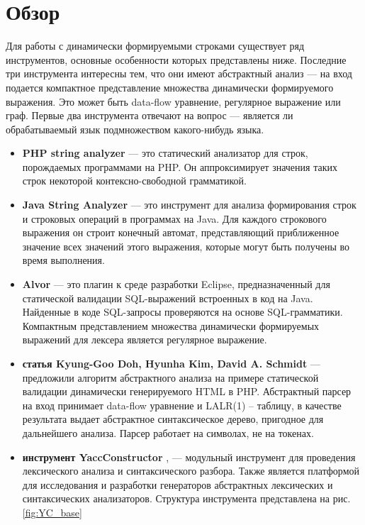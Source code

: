 \documentclass{matmex-diploma}
\begin{document}
\section{Обзор}
Для работы с динамически формируемыми строками существует ряд инструментов, основные особенности которых представлены ниже. 
Последние три инструмента интересны тем, что они имеют абстрактный анализ --- на вход подается компактное представление множества 
динамически формируемого выражения. Это может быть data-flow уравнение, регулярное выражение или граф. Первые два инструмента отвечают 
на вопрос --- является ли обрабатываемый язык подмножеством какого-нибудь языка. 
\begin{itemize}
\item \textbf{PHP string analyzer} \cite{PHPsa} --- это статический анализатор для строк, порождаемых программами на PHP. Он аппроксимирует значения 
таких строк некоторой контексно-свободной грамматикой.
\item \textbf{Java String Analyzer} \cite{Jsa} --- это инструмент для анализа формирования строк и строковых операций в программах на Java. 
Для каждого строкового выражения он строит конечный автомат, представляющий приближенное значение всех значений этого выражения, 
которые могут быть получены во время выполнения.
\item \textbf{Alvor} \cite{Alvor} --- это плагин к среде разработки Eclipse, предназначенный для статической валидации SQL-выражений встроенных в код на Java. 
Найденные в коде  SQL-запросы проверяются на основе SQL-грамматики.  Компактным представлением множества динамически формируемых выражений для лексера 
является регулярное выражение.
\item \textbf{статья Kyung-Goo Doh, Hyunha Kim, David A. Schmidt} \cite{Doh} --- предложили алгоритм абстрактного анализа на примере статической 
валидации  динамически генерируемого HTML в PHP. Абстрактный парсер на вход принимает data-flow уравнение и LALR(1) -- таблицу, в качестве результата 
выдает абстрактное синтаксическое дерево, пригодное для дальнейшего анализа. Парсер работает на символах, не на токенах. 
\item \textbf{инструмент YaccConstructor} \cite{YC}, \cite{YC_article} --- модульный инструмент для проведения лексического  анализа и синтаксического разбора. 
Также является платформой для исследования и разработки генераторов абстрактных лексических и синтаксических анализаторов.
Структура инструмента представлена на рис.\ref{fig:YC_base}


\end{itemize}
\end{document}

